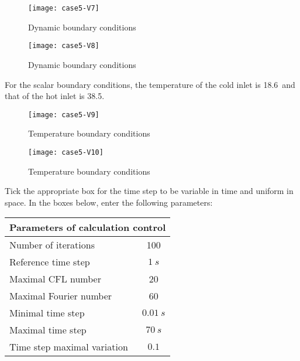 \begin{figure}[h!]
\begin{center}
\texttt{[image: case5-V7]}
\caption{Dynamic boundary conditions}
\label{fig6_e5}
\end{center}
\end{figure}

\begin{figure}[h!]
\begin{center}
\texttt{[image: case5-V8]}
\caption{Dynamic boundary conditions}
\label{fig6_e5}
\end{center}
\end{figure}

\newpage
For the scalar boundary conditions, the temperature of the cold inlet is
18.6\degresC\ and that of the hot inlet is 38.5\degresC.\\

\begin{figure}[h!]
\begin{center}
\texttt{[image: case5-V9]}
\caption{Temperature boundary conditions}
\label{fig8_e5}
\end{center}
\end{figure}


\begin{figure}[h!]
\begin{center}
\texttt{[image: case5-V10]}
\caption{Temperature boundary conditions}
\label{fig8_e5}
\end{center}
\end{figure}

\newpage
Tick the appropriate box for the time step to be variable in time and uniform in
space. In the boxes below, enter the following parameters:
\begin{center}
\begin{tabular}{|l|c|}
\hline
\multicolumn{2}{|c|}{Parameters of calculation control} \\
\hline
Number of iterations & 100 \\
\hline
Reference time step & $1\ s$ \\
\hline
Maximal CFL number & 20 \\
\hline
Maximal Fourier number & 60 \\
\hline
Minimal time step & $0.01\ s$ \\
\hline
Maximal time step & $70\ s$ \\
\hline
Time step maximal variation & $0.1$ \\
\hline
\end{tabular}\\
\end{center}

